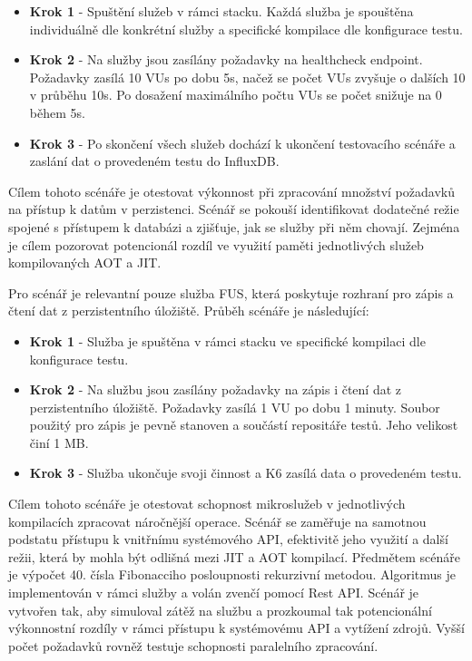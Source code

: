\begin{itemize}
    \item \textbf{Krok 1} - Spuštění služeb v rámci stacku. Každá služba je spouštěna individuálně dle konkrétní služby a specifické kompilace dle konfigurace testu.
    \item \textbf{Krok 2} - Na služby jsou zasílány požadavky na healthcheck endpoint. Požadavky zasílá 10 VUs po dobu 5s, načež se počet VUs zvyšuje o dalších 10 v průběhu 10s. Po dosažení maximálního počtu VUs se počet snižuje na 0 během 5s.
    \item \textbf{Krok 3} - Po skončení všech služeb dochází k ukončení testovacího scénáře a zaslání dat o provedeném testu do InfluxDB.
\end{itemize}


Cílem tohoto scénáře je otestovat výkonnost při zpracování množství požadavků na přístup k datům v perzistenci. Scénář se pokouší identifikovat dodatečné režie spojené s přístupem k databázi a zjišťuje, jak se služby při něm chovají. Zejména je cílem pozorovat potencionál rozdíl ve využití paměti jednotlivých služeb kompilovaných AOT a JIT.


Pro scénář je relevantní pouze služba FUS, která poskytuje rozhraní pro zápis a čtení dat z perzistentního úložiště. Průběh scénáře je následující:

\begin{itemize}
    \item \textbf{Krok 1} - Služba je spuštěna v rámci stacku ve specifické kompilaci dle konfigurace testu.
    \item \textbf{Krok 2} - Na službu jsou zasílány požadavky na zápis i čtení dat z perzistentního úložiště. Požadavky zasílá 1 VU po dobu 1 minuty. Soubor použitý pro zápis je pevně stanoven a součástí repositáře testů. Jeho velikost činí 1 MB.
    \item \textbf{Krok 3} - Služba ukončuje svoji činnost a K6 zasílá data o provedeném testu.
\end{itemize}


Cílem tohoto scénáře je otestovat schopnost mikroslužeb v jednotlivých kompilacích zpracovat náročnější operace. Scénář se zaměřuje na samotnou podstatu přístupu k vnitřnímu systémového API, efektivitě jeho využití a další režii, která by mohla být odlišná mezi JIT a AOT kompilací. Předmětem scénáře je výpočet 40. čísla Fibonacciho posloupnosti rekurzivní metodou. Algoritmus je implementován v rámci služby a volán zvenčí pomocí Rest API. Scénář je vytvořen tak, aby simuloval zátěž na službu a prozkoumal tak potencionální výkonnostní rozdíly v rámci přístupu k systémovému API a vytížení zdrojů. Vyšší počet požadavků rovněž testuje schopnosti paralelního zpracování.

